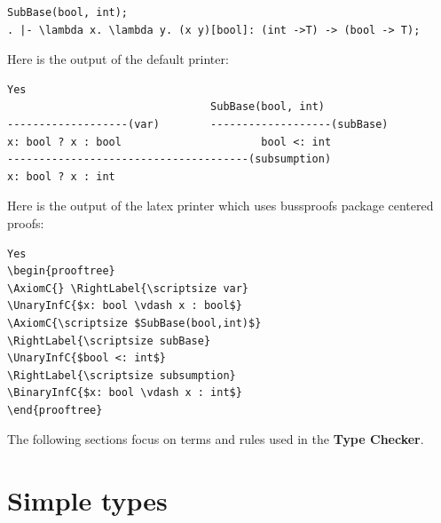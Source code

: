 \documentclass[12pt,a4paper]{article}
\begin{document}


\begin{lstlisting}  
SubBase(bool, int);
. |- \lambda x. \lambda y. (x y)[bool]: (int ->T) -> (bool -> T);
\end{lstlisting}

Here is the output of the default printer:


\begin{lstlisting}  
Yes
                                SubBase(bool, int)
-------------------(var)        -------------------(subBase)
x: bool ? x : bool                      bool <: int
--------------------------------------(subsumption)
x: bool ? x : int

\end{lstlisting}

Here is the output of the latex printer which uses bussproofs package centered proofs:


\begin{lstlisting} 
Yes
\begin{prooftree}
\AxiomC{} \RightLabel{\scriptsize var}
\UnaryInfC{$x: bool \vdash x : bool$}
\AxiomC{\scriptsize $SubBase(bool,int)$}
\RightLabel{\scriptsize subBase}
\UnaryInfC{$bool <: int$}
\RightLabel{\scriptsize subsumption}
\BinaryInfC{$x: bool \vdash x : int$}
\end{prooftree}

\end{lstlisting} 

The following sections focus on terms and rules used in the \textbf{Type Checker}. 

\section{Simple types} \label{sec:simple}
\end{document}
